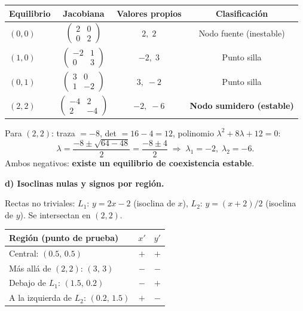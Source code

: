 \documentclass[12pt,letterpaper]{article}
\begin{document}
\begin{table}[H]
\centering
\begin{tabular}{lccc}
\toprule
Equilibrio & Jacobiana & Valores propios & Clasificación \\
\midrule
$(0,0)$ & $\begin{pmatrix}2&0\\0&2\end{pmatrix}$ & $2,\;2$ & Nodo fuente (inestable) \\[8pt]
$(1,0)$ & $\begin{pmatrix}-2&1\\0&3\end{pmatrix}$ & $-2,\;3$ & Punto silla \\[8pt]
$(0,1)$ & $\begin{pmatrix}3&0\\1&-2\end{pmatrix}$ & $3,\;-2$ & Punto silla \\[8pt]
$(2,2)$ & $\begin{pmatrix}-4&2\\2&-4\end{pmatrix}$ & $-2,\;-6$ & \textbf{Nodo sumidero (estable)} \\
\bottomrule
\end{tabular}
\end{table}

Para $(2,2)$: traza $=-8$, det $=16-4=12$, polinomio $\lambda^2+8\lambda+12=0$:
\[
  \lambda = \frac{-8\pm\sqrt{64-48}}{2} = \frac{-8\pm4}{2} \;\Rightarrow\; \lambda_1=-2,\;\lambda_2=-6.
\]
Ambos negativos: \textbf{existe un equilibrio de coexistencia estable}.

\bigskip
\noindent\textbf{d) Isoclinas nulas y signos por región.}

Rectas no triviales: $L_1:\,y=2x-2$ (isoclina de $x$), $L_2:\,y=(x+2)/2$ (isoclina de $y$).
Se intersectan en $(2,2)$.

\begin{table}[H]
\centering
\begin{tabular}{lcc}
\toprule
Región (punto de prueba) & $x'$ & $y'$ \\
\midrule
Central: $(0.5,\,0.5)$ & $+$ & $+$ \\
Más allá de $(2,2)$: $(3,\,3)$ & $-$ & $-$ \\
Debajo de $L_1$: $(1.5,\,0.2)$ & $-$ & $+$ \\
A la izquierda de $L_2$: $(0.2,\,1.5)$ & $+$ & $-$ \\
\bottomrule
\end{tabular}
\end{table}
\end{document}

